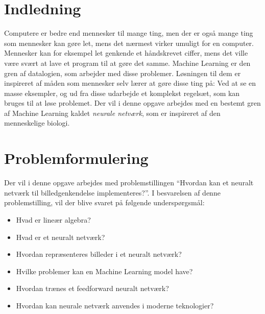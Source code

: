 \documentclass[a4paper, 12pt]{article}
\theoremstyle{definition}
\begin{document}
\newpage
\tableofcontents
\newpage

\pagestyle{fancy}
\fancyhf{}
\pagenumberinfooter
{}

\section{Indledning}
Computere er bedre end mennesker til mange ting, men der er også mange ting som mennesker kan gøre let, mens det nærmest virker umuligt for en computer. Mennesker kan for eksempel let genkende et håndskrevet ciffer, mens det ville være svært at lave et program til at gøre det samme. Machine Learning er den gren af datalogien, som arbejder med disse problemer. Løsningen til dem er inspireret af måden som mennesker selv lærer at gøre disse ting på: Ved at se en masse eksempler, og ud fra disse udarbejde et komplekst regelsæt, som kan bruges til at løse problemet. Der vil i denne opgave arbejdes med en bestemt gren af Machine Learning kaldet \emph{neurale netværk}, som er inspireret af den menneskelige biologi.

\section{Problemformulering}
Der vil i denne opgave arbejdes med problemstillingen ``Hvordan kan et neuralt netværk til billedgenkendelse implementeres?''. I besvarelsen af denne problemstilling, vil der blive svaret på følgende underspørgsmål:
\begin{itemize}
  \item Hvad er lineær algebra?
  \item Hvad er et neuralt netværk?
  \item Hvordan repræsenteres billeder i et neuralt netværk?
  \item Hvilke problemer kan en Machine Learning model have?
  \item Hvordan trænes et feedforward neuralt netværk?
  \item Hvordan kan neurale netværk anvendes i moderne teknologier?
\end{itemize}







\end{document}
